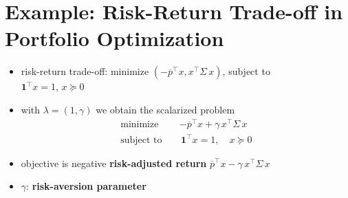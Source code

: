 \documentclass[11pt]{extarticle}
\newcommand{\ds}{\displaystyle}
\theoremstyle{definition}
\begin{document}
\newpage

\section*{Example: Risk-Return Trade-off in Portfolio Optimization}

\begin{itemize}
  \item risk-return trade-off: minimize $\ds(-\overline{p}^\top x, x^\top\Sigma\,x)$, subject to \\$\mathbf{1}^\top x = 1$, $x\succcurlyeq 0$
  \item with $\lambda = (1, \gamma)$ we obtain the scalarized problem
    \begin{align*}
      \text{minimize}\quad &-\overline{p}^\top x + \gamma\,x^\top\Sigma\,x \\
      \text{subject to}\quad &\,\mathbf{1}^\top x = 1,\quad x\succcurlyeq 0
    \end{align*}
  \item objective is negative {\bf risk-adjusted return} $\overline{p}^\top x - \gamma\,x^\top\Sigma\,x$ 
  \item $\gamma$: {\bf risk-aversion parameter}
\end{itemize}

\newpage



\end{document}
